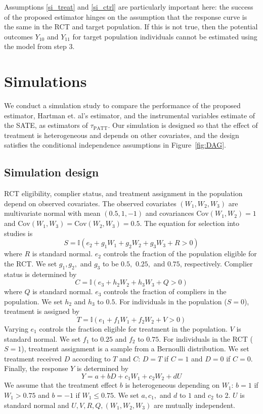 \documentclass[12pt]{article}
\newcommand{\ind}{\mathbb{I}} %
\newcommand{\cov}{\mathrm{Cov}}
\begin{document}
Assumptions \eqref{si_treat} and \eqref{si_ctrl} are particularly important here: the success of the proposed estimator hinges on the assumption that the response curve is the same in the RCT and target population.  If this is not true, then the potential outcomes $Y_{10}$ and $Y_{11}$ for target population individuals cannot be estimated using the model from step 3.



\section{Simulations}
We conduct a simulation study to compare the performance of the proposed estimator, Hartman et. al's estimator, and the instrumental variables estimate of the SATE, as estimators of $\tau_{\text{PATT}}$.  Our simulation is designed so that the effect of treatment is heterogeneous and depends on other covariates, and the design satisfies the conditional independence assumptions in Figure~\ref{fig:DAG}.

\subsection{Simulation design}
RCT eligibility, complier status, and treatment assignment in the population depend on observed covariates. 
The observed covariates $(W_1, W_2, W_3)$ are multivariate normal with mean $(0.5, 1, -1)$ and covariances $\cov(W_1, W_2) = 1$ and $\cov(W_1, W_3) = \cov(W_2, W_3) = 0.5$. 
 The  equation for selection into studies is
 $$ S = \ind(e_2 + g_1W_1 + g_2W_2 + g_3W_3 + R > 0)$$
  where $R$ is standard normal. $e_2$ controls the fraction of the population eligible for the RCT. We set $g_1, g_2,$ and $g_3$ to be $0.5,$ $0.25,$ and $0.75$, respectively.
Complier status is determined by
$$C = \ind(e_3 + h_2W_2 + h_3W_3 + Q > 0)$$
where $Q$ is standard normal. $e_3$ controls the fraction of compliers in the population. We set $h_2$ and $h_3$ to $0.5$.
 For individuals in the population ($S=0$),  treatment is assigned by
  $$T = \ind(e_1 + f_1W_1 + f_2W_2 + V > 0)$$
Varying $e_1$ controls the fraction eligible for treatment in the population. $V$ is standard normal. We set $f_1$ to $0.25$ and $f_2$ to $0.75$.  For individuals in the RCT ($S=1$), treatment assignment is a sample from a Bernoulli distribution.
We set treatment received $D$ according to $T$ and $C$: $D = T$ if $C=1$ and $D = 0$ if $C=0$.
Finally, the response $Y$ is determined by 
$$Y = a + bD + c_1W_1 + c_2W_2 + dU$$
 We assume that the treatment effect $b$ is heterogeneous depending on $W_1$: $b = 1$ if $W_1 > 0.75$ and $b=-1$ if $W_1 \leq 0.75$.   We set $a, c_1,$ and $d$ to $1$ and $c_2$ to $2$. $U$ is standard normal and $U, V, R, Q, (W_1, W_2, W_3)$ are mutually independent.\\
 
\end{document}
